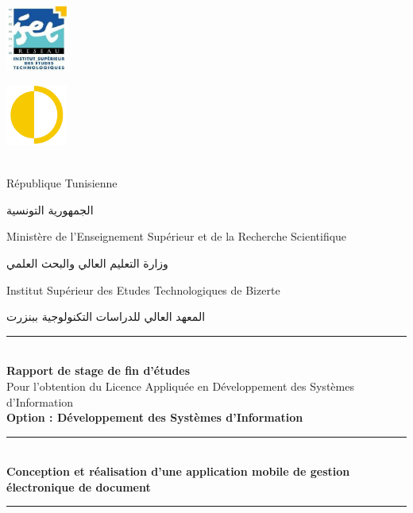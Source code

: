 \documentclass[a4paper,12pt]{report}
\begin{document}
\begin{titlepage}
    \centering
    \begin{minipage}{0cm}
        \begin{center}
            \includegraphics[width=2cm]{iset_logo.png}
        \end{center}
    \end{minipage}\hfill
    \begin{minipage}{10cm}
        \begin{flushright}
            \includegraphics[width=2cm]{neoledge_logo.png}\\
        \end{flushright}
    \end{minipage}\hfill\\
    {\small République Tunisienne }\\
    \begin{Arabic}
    الجمهورية التونسية \\
    \end{Arabic}
    {\small Ministère de l'Enseignement Supérieur et de la Recherche Scientifique  }\\
        \begin{Arabic}
          وزارة التعليم العالي والبحث العلمي   \\
    \end{Arabic}
    {\small Institut Supérieur des Etudes Technologiques de Bizerte  }\\
        \begin{Arabic}
          المعهد العالي للدراسات التكنولوجية ببنزرت   \\
    \end{Arabic}
\rule{\linewidth}{0.3mm} \\[0.4cm]

\vspace{5mm}
{\large \bfseries Rapport de stage de fin d'études}\\[0.5cm]
{\large Pour l'obtention du Licence Appliquée en Développement des Systèmes d'Information}\\[0.5cm]
{\large \bfseries{Option : Développement des Systèmes d'Information} \\ }
\vspace{10mm}
\rule{\linewidth}{0.3mm} \\[0.4cm]
{ \huge \bfseries Conception et réalisation d'une application mobile de gestion électronique de document\\[0.4cm] }
\rule{\linewidth}{0.3mm} \\[1cm]
\vspace{10mm}


\end{titlepage}
\end{document}
